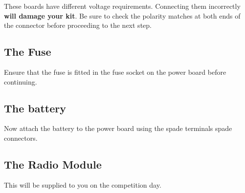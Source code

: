 These boards have different voltage requirements. Connecting them incorrectly \textbf{will damage your kit}. Be sure to check the polarity matches at both ends of the connector before proceeding to the next step.

\subsection{The Fuse}
Ensure that the fuse is fitted in the fuse socket on the power board before continuing.

\subsection{The battery}
Now attach the battery to the power board using the spade terminals spade connectors. 

\subsection{The Radio Module}
This will be supplied to you on the competition day.
